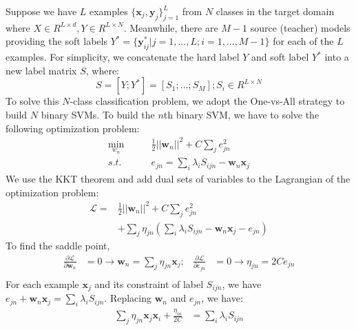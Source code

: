 Suppose we have $L$ examples $\{\textbf{x}_j,\textbf{y}_j\}_{j=1}^L$ from $N$ classes in the target domain where $X\in R^{L\times d}, Y\in R^{L\times N}$. Meanwhile, there are $M-1$ source (teacher) models providing the soft labels $Y^*=\{\textbf{y}^*_{ij}|j=1,...,L;i=1,...,M-1\}$ for each of the $L$ examples.
For simplicity, we concatenate the hard label $Y$ and soft label $Y^*$ into a new label matrix $S$, where:
\[S=[Y;Y^*]=[S_1;...;S_M]; S_i \in R^{L \times N}\]
To solve this $N$-class classification problem, we adopt the One-vs-All strategy to build $N$ binary SVMs.
To build the $n$th binary SVM, we have to solve the following optimization problem: 
\begin{equation}\label{eq:multi-distill}
\begin{aligned}
\underset{w_n}{\min} \qquad & \frac{1}{2}{|| \textbf{w}_n ||^2} + C\sum_{j}{e_{jn}^2} \quad\\
s.t. \qquad& e_{jn} = \sum_i\lambda_iS_{ijn} - \textbf{w}_n\textbf{x}_j%
\end{aligned}  
\end{equation}
We use the KKT theorem \cite{cristianini2000introduction} and add dual sets of variables to the Lagrangian of the optimization problem:
\begin{equation}
\begin{aligned}
\mathcal{L}=&\frac{1}{2}{|| \textbf{w}_n ||^2} + C\sum_{j} {e_{jn}^2}\\
&+\sum_{j}\eta_{jn}\left(\sum_i\lambda_iS_{ijn} - \textbf{w}_n\textbf{x}_j-e_{jn}\right)%
\end{aligned}
\end{equation}
To find the saddle point, 
\begin{equation}
\begin{aligned}
\frac{{\partial \mathcal{L}}}{{\partial \textbf{w}_n}}& =0 \rightarrow \textbf{w}_n = \sum_{j}\eta_{jn} {\textbf{x}_j}; &
\frac{{\partial \mathcal{L}}}{{\partial {e_{jn}}}} & =0 \rightarrow \eta_{jn} = 2C {e_{jn}}\\
\end{aligned}
\end{equation}
For each example $\textbf{x}_j$ and its constraint of label $S_{ijn}$, we have $e_{jn}  + \textbf{w}_n\textbf{x}_j= \sum_i\lambda_iS_{ijn}$. Replacing $\textbf{w}_n$ and $e_{jn}$,  we have:
\begin{equation}
\begin{aligned}
\sum_j\eta_{jn}\textbf{x}_j\textbf{x}_i+\frac{\eta_{in}}{2C}&=\sum_i\lambda_iS_{ijn}\\
\end{aligned}
\end{equation}


